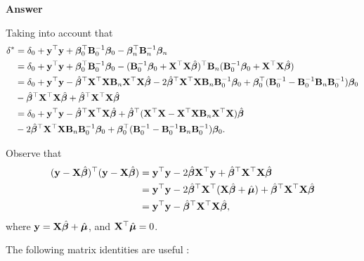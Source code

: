 \begin{enumerate}[leftmargin=*]
\textbf{Answer}

Taking into account that 
\begin{align*}
	\delta^* & = \delta_0 + {\bf{y}}^{\top}{\bf{y}} + \bm{\beta}_0^{\top}{\bf{B}}_0^{-1}\bm{\beta}_0 - \bm{\beta}_n^{\top}{\bf{B}}_n^{-1}\bm{\beta}_n \\
	& = \delta_0 + {\bf{y}}^{\top}{\bf{y}} + \bm{\beta}_0^{\top}{\bf{B}}_0^{-1}\bm{\beta}_0 -({\bf{B}}_0^{-1}\bm{\beta}_0 + {\bf{X}}^{\top}{\bf{X}}\hat{\bm{\beta}})^{\top}{\bf{B}}_n({\bf{B}}_0^{-1}\bm{\beta}_0 + {\bf{X}}^{\top}{\bf{X}}\hat{\bm{\beta}}) \\
	& = \delta_0 + {\bf{y}}^{\top}{\bf{y}} - \hat{\bm{\beta}}^{\top}{\bf{X}}^{\top}{\bf{X}}{\bf{B}}_n{\bf{X}}^{\top}{\bf{X}}\hat{\bm{\beta}} - 2\hat{\bm{\beta}}^{\top}{\bf{X}}^{\top}{\bf{X}}{\bf{B}}_n{\bf{B}}_0^{-1}\bm{\beta}_0 + \bm{\beta}_0^{\top}({\bf{B}}_0^{-1} - {\bf{B}}_0^{-1}{\bf{B}}_n{\bf{B}}_0^{-1})\bm{\beta}_0 \\
	&- \hat{\bm{\beta}}^{\top}{\bf{X}}^{\top}{\bf{X}}\hat{\bm{\beta}} + \hat{\bm{\beta}}^{\top}{\bf{X}}^{\top}{\bf{X}}\hat{\bm{\beta}} \\
	& = \delta_0 + {\bf{y}}^{\top}{\bf{y}} - \hat{\bm{\beta}}^{\top}{\bf{X}}^{\top}{\bf{X}}\hat{\bm{\beta}} + \hat{\bm{\beta}}^{\top}({\bf{X}}^{\top}{\bf{X}} - {\bf{X}}^{\top}{\bf{X}}{\bf{B}}_n{\bf{X}}^{\top}{\bf{X}})\hat{\bm{\beta}} \\
	& - 2\hat{\bm{\beta}}^{\top}{\bf{X}}^{\top}{\bf{X}}{\bf{B}}_n{\bf{B}}_0^{-1}\bm{\beta}_0 + \bm{\beta}_0^{\top}({\bf{B}}_0^{-1} - {\bf{B}}_0^{-1}{\bf{B}}_n{\bf{B}}_0^{-1})\bm{\beta}_0. 
\end{align*}

Observe that 
\begin{align*}
	({\bf{y}} - {\bf{X}}\hat{\bm{\beta}})^{\top}({\bf{y}} - {\bf{X}}\hat{\bm{\beta}}) & = {\bf{y}}^{\top}{\bf{y}} - 2\hat{\bm{\beta}}{\bf{X}}^{\top}{\bf{y}} + \hat{\bm{\beta}}^{\top}{\bf{X}}^{\top}{\bf{X}}\hat{\bm{\beta}}\\
	& = {\bf{y}}^{\top}{\bf{y}} - 2\hat{\bm{\beta}}^{\top}{\bf{X}}^{\top}({\bf{X}}\hat{\bm{\beta}}+\hat{\bm{\mu}}) + \hat{\bm{\beta}}^{\top}{\bf{X}}^{\top}{\bf{X}}\hat{\bm{\beta}}\\
	& = {\bf{y}}^{\top}{\bf{y}} - \hat{\bm{\beta}}^{\top}{\bf{X}}^{\top}{\bf{X}}\hat{\bm{\beta}},
\end{align*}
where ${\bf{y}}={\bf{X}}\hat{\bm{\beta}}+\hat{\bm{\mu}}$, and ${\bf{X}}^{\top}\hat{\bm{\mu}}=0$.

The following matrix identities are useful \cite{Smith1973}:


\end{enumerate}
